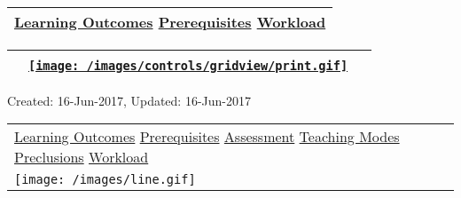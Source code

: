 ~

\hypertarget{ctl00_ctl00_ContentPlaceHolder1_ContentPlaceHolder1_pnlReferences}{}
\begin{longtable}[]{@{}l@{}}
\toprule
\protect\hypertarget{ctl00_ctl00_ContentPlaceHolder1_ContentPlaceHolder1_lblSectionBottom}{}{\protect\hyperlink{Learningux5cux2520Outcomes}{Learning
Outcomes} \textbar{} \protect\hyperlink{Prerequisites}{Prerequisites}
\textbar{} \protect\hyperlink{Workload}{Workload}}\tabularnewline
\bottomrule
\end{longtable}

\hypertarget{ctl00_ctl00_ContentPlaceHolder1_ContentPlaceHolder1_UP}{}
\hypertarget{contentstart}{}
\hypertarget{ctl00_ctl00_ContentPlaceHolder1_ContentPlaceHolder1_pnlMain}{}
\begin{longtable}[]{@{}ll@{}}
\toprule
&
{\href{javascript:PrintThisPage();}{\texttt{[image: /images/controls/gridview/print.gif]}}~~}\tabularnewline
\bottomrule
\end{longtable}

\protect\hypertarget{ctl00_ctl00_ContentPlaceHolder1_ContentPlaceHolder1_LV_UpdateInfo_ctrl0_txtDate}{}{Created:
16-Jun-2017, Updated: 16-Jun-2017}

\begin{longtable}[]{@{}l@{}}
\toprule
\protect\hypertarget{ctl00_ctl00_ContentPlaceHolder1_ContentPlaceHolder1_lblSectionTop}{}{\protect\hyperlink{Learningux5cux2520Outcomes}{Learning
Outcomes} \textbar{} \protect\hyperlink{Prerequisites}{Prerequisites}
\textbar{} \protect\hyperlink{Assessment}{Assessment} \textbar{}
\protect\hyperlink{Teachingux5cux2520Modes}{Teaching Modes} \textbar{}
\protect\hyperlink{Preclusions}{Preclusions} \textbar{}
\protect\hyperlink{Workload}{Workload}}\tabularnewline
\texttt{[image: /images/line.gif]}\tabularnewline
\bottomrule
\end{longtable}

